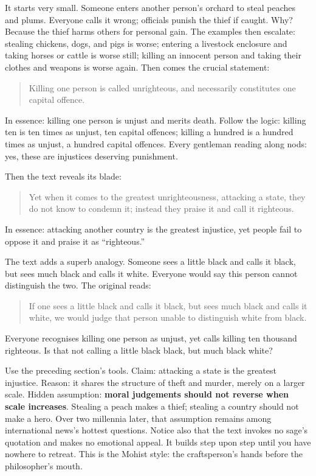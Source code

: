 It starts very small. Someone enters another person's orchard to steal peaches and plums. Everyone calls it wrong; officials punish the thief if caught. Why? Because the thief harms others for personal gain. The examples then escalate: stealing chickens, dogs, and pigs is worse; entering a livestock enclosure and taking horses or cattle is worse still; killing an innocent person and taking their clothes and weapons is worse again. Then comes the crucial statement:

\begin{quote}
Killing one person is called unrighteous, and necessarily constitutes one capital offence.
\end{quote}
In essence: killing one person is unjust and merits death. Follow the logic: killing ten is ten times as unjust, ten capital offences; killing a hundred is a hundred times as unjust, a hundred capital offences. Every gentleman reading along nods: yes, these are injustices deserving punishment.

Then the text reveals its blade:

\begin{quote}
Yet when it comes to the greatest unrighteousness, attacking a state, they do not know to condemn it; instead they praise it and call it righteous.
\end{quote}
In essence: attacking another country is the greatest injustice, yet people fail to oppose it and praise it as ``righteous.''

The text adds a superb analogy. Someone sees a little black and calls it black, but sees much black and calls it white. Everyone would say this person cannot distinguish the two. The original reads:

\begin{quote}
If one sees a little black and calls it black, but sees much black and calls it white, we would judge that person unable to distinguish white from black.
\end{quote}
Everyone recognises killing one person as unjust, yet calls killing ten thousand righteous. Is that not calling a little black black, but much black white?

Use the preceding section's tools. Claim: attacking a state is the greatest injustice. Reason: it shares the structure of theft and murder, merely on a larger scale. Hidden assumption: \textbf{moral judgements should not reverse when scale increases}. Stealing a peach makes a thief; stealing a country should not make a hero. Over two millennia later, that assumption remains among international news's hottest questions. Notice also that the text invokes no sage's quotation and makes no emotional appeal. It builds step upon step until you have nowhere to retreat. This is the Mohist style: the craftsperson's hands before the philosopher's mouth.

